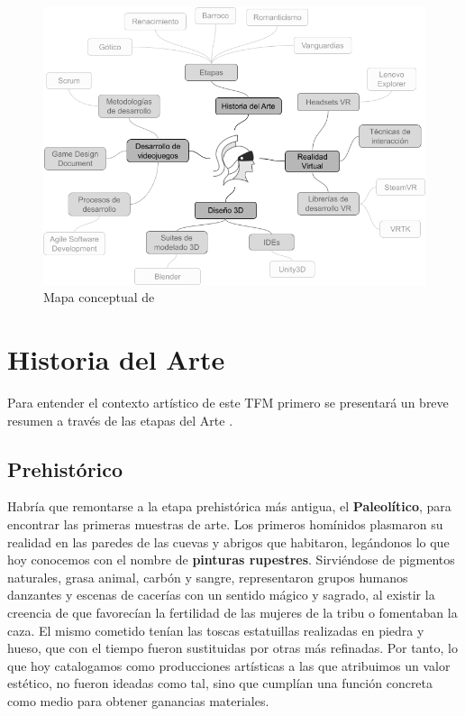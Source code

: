 \begin{figure}[!h]
    \begin{center}
        \includegraphics[width=1\textwidth]{imagenes/2/mapa-conceptual.png}
        \caption{Mapa conceptual de \MineRVa}
        \label{fig:mapa-conceptual}
    \end{center}
\end{figure}

\section{Historia del Arte}

Para entender el contexto artístico de este \acs{TFM} primero se presentará un breve resumen a través de las etapas del Arte \cite{ramirez-0610}.

\subsection{Prehistórico}

Habría que remontarse a la etapa prehistórica más antigua, el \textbf{Paleolítico}, para encontrar las primeras muestras de arte. Los primeros homínidos plasmaron su realidad en las paredes de las cuevas y abrigos que habitaron, legándonos lo que hoy conocemos con el nombre de \textbf{pinturas rupestres}. Sirviéndose de pigmentos naturales, grasa animal, carbón y sangre, representaron grupos humanos danzantes y escenas de cacerías con un sentido mágico y sagrado, al existir la creencia de que favorecían la fertilidad de las mujeres de la tribu o fomentaban la caza. El mismo cometido tenían las toscas estatuillas realizadas en piedra y hueso, que con el tiempo fueron sustituidas por otras más refinadas. Por tanto, lo que hoy catalogamos como producciones artísticas a las que atribuimos un valor estético, no fueron ideadas como tal, sino que cumplían una función concreta como medio para obtener ganancias materiales.

